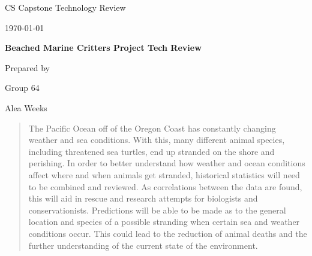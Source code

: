\documentclass[onecolumn, draftclsnofoot,10pt, compsoc]{IEEEtran}
\def \CapstoneTeamName{		Beached Marine Critters Project Team}
\def \CapstoneTeamNumber{		64}
\def \GroupMemberOne{			Alea Weeks}
\def \CapstoneProjectName{		Beached Marine Critters Project Tech Review}
\def \DocType{		%
				Technology Review
				}
\newcommand{\NameSigPair}[1]{\par
\makebox[2.75in][r]{#1} \hfil 	\makebox[3.25in]{\makebox[2.25in]{\hrulefill} \hfill		\makebox[.75in]{\hrulefill}}
\par\vspace{-12pt} \textit{\tiny\noindent
\makebox[2.75in]{} \hfil		\makebox[3.25in]{\makebox[2.25in][r]{Signature} \hfill	\makebox[.75in][r]{Date}}}}
\renewcommand{\NameSigPair}[1]{#1}
\begin{document}
\begin{titlepage}
    \begin{singlespace}
        \hfill 
        \par\vspace{.2in}
        \centering
        \scshape{
            \huge CS Capstone \DocType \par
            {\normalsize\today}\par
            \vspace{.5in}
            \textbf{\Huge\CapstoneProjectName}\par
            \vspace{1in}
            \vspace{.5in}
            {\large Prepared by }\par
            Group\CapstoneTeamNumber\par
            \vspace{5pt}
            {\Large
                \NameSigPair{\GroupMemberOne}\par
            }
            \vspace{20pt}
        }
        \vfill
        \begin{abstract}
		    The Pacific Ocean off of the Oregon Coast has constantly changing weather and sea conditions.  With this, many different animal species, including threatened sea turtles, end up stranded
            on the shore and perishing. In order to better understand how weather and ocean conditions affect where and when animals get stranded, historical statistics will need to be combined and reviewed. As correlations between the data are found, this will aid in rescue and research attempts for biologists and conservationists. Predictions will be able to be made as to the general location and species of a possible stranding when certain sea and weather conditions occur.  This could lead to the reduction of animal deaths and the further understanding of the current state of the environment.
        \end{abstract}     
    \end{singlespace}
\end{titlepage}
\newpage
{}
\tableofcontents
\clearpage
\end{document}
